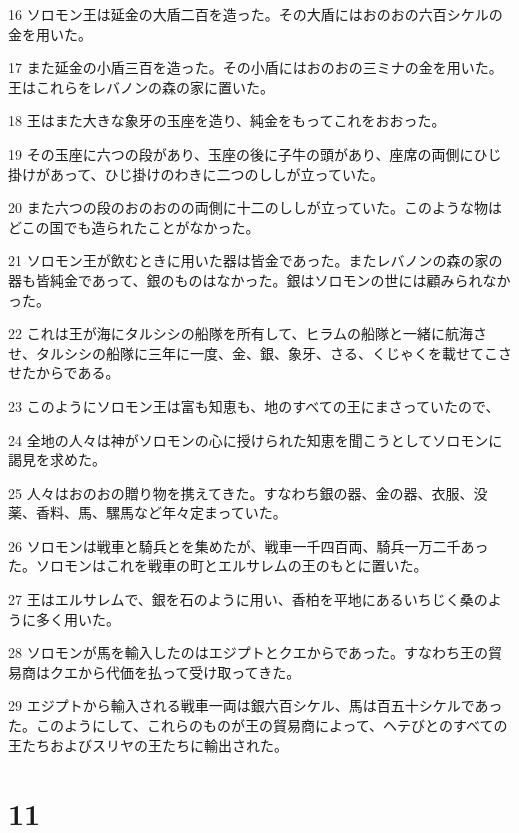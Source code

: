 \par 16 ソロモン王は延金の大盾二百を造った。その大盾にはおのおの六百シケルの金を用いた。
\par 17 また延金の小盾三百を造った。その小盾にはおのおの三ミナの金を用いた。王はこれらをレバノンの森の家に置いた。
\par 18 王はまた大きな象牙の玉座を造り、純金をもってこれをおおった。
\par 19 その玉座に六つの段があり、玉座の後に子牛の頭があり、座席の両側にひじ掛けがあって、ひじ掛けのわきに二つのししが立っていた。
\par 20 また六つの段のおのおのの両側に十二のししが立っていた。このような物はどこの国でも造られたことがなかった。
\par 21 ソロモン王が飲むときに用いた器は皆金であった。またレバノンの森の家の器も皆純金であって、銀のものはなかった。銀はソロモンの世には顧みられなかった。
\par 22 これは王が海にタルシシの船隊を所有して、ヒラムの船隊と一緒に航海させ、タルシシの船隊に三年に一度、金、銀、象牙、さる、くじゃくを載せてこさせたからである。
\par 23 このようにソロモン王は富も知恵も、地のすべての王にまさっていたので、
\par 24 全地の人々は神がソロモンの心に授けられた知恵を聞こうとしてソロモンに謁見を求めた。
\par 25 人々はおのおの贈り物を携えてきた。すなわち銀の器、金の器、衣服、没薬、香料、馬、騾馬など年々定まっていた。
\par 26 ソロモンは戦車と騎兵とを集めたが、戦車一千四百両、騎兵一万二千あった。ソロモンはこれを戦車の町とエルサレムの王のもとに置いた。
\par 27 王はエルサレムで、銀を石のように用い、香柏を平地にあるいちじく桑のように多く用いた。
\par 28 ソロモンが馬を輸入したのはエジプトとクエからであった。すなわち王の貿易商はクエから代価を払って受け取ってきた。
\par 29 エジプトから輸入される戦車一両は銀六百シケル、馬は百五十シケルであった。このようにして、これらのものが王の貿易商によって、ヘテびとのすべての王たちおよびスリヤの王たちに輸出された。

\chapter{11}

